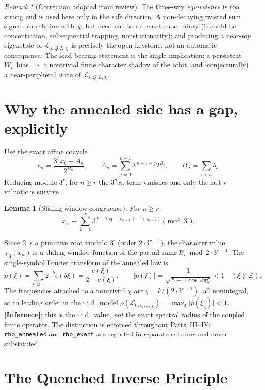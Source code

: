 \documentclass[11pt]{article}
\newcommand{\Z}{\mathbb{Z}}
\newcommand{\Lcal}{\mathcal{L}}
\newcommand{\epi}[1]{{\small\sffamily\textbf{[#1]}}}
\theoremstyle{plain}
\newtheorem{lemma}{Lemma}
\theoremstyle{remark}
\newtheorem*{remark}{Remark}
\begin{document}
\begin{remark}[Correction adopted from review]
The three-way \emph{equivalence} is too strong and is used here only in the safe
direction. A non-decaying twisted sum signals correlation with $\chi$, but need
not be an exact coboundary (it could be concentration, subsequential trapping,
nonstationarity); and producing a near-\emph{top} eigenstate of
$\Lcal_{s,Q,L,\chi}$ is precisely the open keystone, not an automatic consequence.
The load-bearing statement is the single implication: a persistent $W_n$ bias
$\Longrightarrow$ a nontrivial finite character shadow of the orbit, and
(conjecturally) a near-peripheral state of $\Lcal_{s,Q,L,\chi}$.
\end{remark}

\section{Why the annealed side has a gap, explicitly}

Use the exact affine cocycle
\[
x_n=\frac{3^n x_0+A_n}{2^{B_n}},\qquad
A_n=\sum_{j=0}^{n-1}3^{\,n-1-j}2^{B_j},\qquad B_n=\sum_{i<n}b_i .
\]
Reducing modulo $3^r$, for $n\ge r$ the $3^n x_0$ term vanishes and only the last
$r$ valuations survive.

\begin{lemma}[Sliding-window congruence]\label{lem:cong}
For $n\ge r$,
\[
x_n \equiv \sum_{k=1}^{r} 3^{\,k-1}\, 2^{-(b_{n-1}+\cdots+b_{n-k})} \pmod{3^r}.
\]
\end{lemma}
\noindent Since $2$ is a primitive root modulo $3^r$ (order $2\cdot3^{r-1}$), the
character value $\chi_3(x_n)$ is a sliding-window function of the partial sums
$B_i\bmod 2\cdot3^{r-1}$. The single-symbol Fourier transform of the annealed law
is
\[
\hat p(\xi)=\sum_{b\ge1}2^{-b}e(b\xi)=\frac{e(\xi)}{2-e(\xi)},
\qquad
\lvert\hat p(\xi)\rvert=\frac{1}{\sqrt{5-4\cos 2\pi\xi}}<1\quad(\xi\notin\Z).
\]
The frequencies attached to a nontrivial $\chi$ are $\xi=k/(2\cdot3^{r-1})$, all
nonintegral, so to leading order in the i.i.d.\ model
$\rho(\Lcal_{0,Q,L,\chi})=\max_\xi\lvert\hat p(\xi_\chi)\rvert<1$.
\epi{Inference}; this is the i.i.d.\ value, \emph{not} the exact spectral radius
of the coupled finite operator. The distinction is enforced throughout
Parts~III--IV: \texttt{rho\_annealed} and \texttt{rho\_exact} are reported in
separate columns and never substituted.

\section{The Quenched Inverse Principle}
\end{document}

